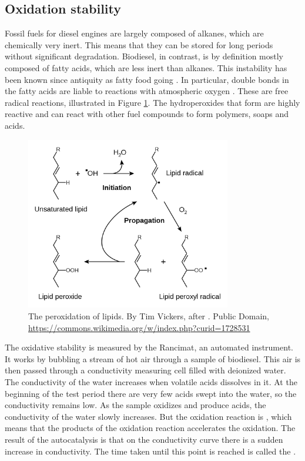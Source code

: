 \subsection{Oxidation stability}
\label{sec:Rancimat}

Fossil fuels for diesel engines are largely composed of alkanes, which are
chemically very inert. This means that they can be stored for long periods
without significant degradation. Biodiesel, in contrast, is by definition
\autocite[Paragraph 4.1.1]{SANS1935} mostly composed of fatty acids, which are
less inert than alkanes. This instability has been known since antiquity as
fatty food going . In particular, double bonds in the fatty
acids are liable to reactions with atmospheric oxygen \autocite{Velasco2010}.
These are free radical reactions, illustrated in Figure \ref{fig:RancidRadical}.
The hydroperoxides that form are highly reactive and can react with other fuel
compounds to form polymers, soaps and acids.

\begin{figure}
\centering
\includegraphics[width=0.8\textwidth]{Figures/1281px-Lipid_peroxidation.png}
\decoRule

\caption[The peroxidation of lipids.]{The peroxidation of lipids. By Tim
Vickers, after \autocite{Young2001}. Public Domain,
\url{https://commons.wikimedia.org/w/index.php?curid=1728531}}

\label{fig:RancidRadical}
\end{figure}

The oxidative stability is measured by the Rancimat, an automated instrument. It
works by bubbling a stream of hot air through a sample of biodiesel. This air is
then passed through a conductivity measuring cell filled with deionized water.
The conductivity of the water increases when volatile acids dissolves in it. At
the beginning of the test period there are very few acids swept into the water,
so the conductivity remains low. As the sample oxidizes and produce acids, the
conductivity of the water slowly increases. But the oxidation reaction is
, which means that the products of the oxidation reaction
accelerates the oxidation. The result of the autocatalysis is that on the
conductivity curve there is a sudden increase in conductivity. The time taken
until this point is reached is called the .

